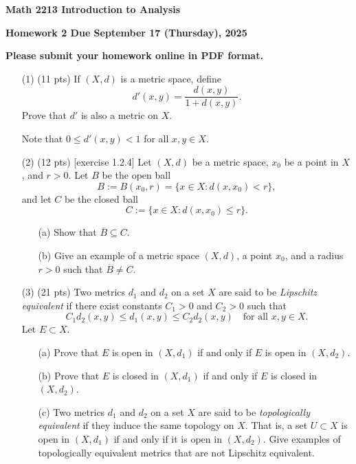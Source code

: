 \documentclass[12pt]{amsart}
\theoremstyle{definition}
\theoremstyle{remark}
\begin{document}
\begin{CJK}{UTF8}{bkai}

{\centerline{\bf Math 2213 Introduction to Analysis  }}

{\centerline{\bf Homework 2  Due   September 17 (Thursday), 2025}}

{\centerline{\bf Please submit your homework online in PDF format.}}


 
\begin{enumerate}

\item[(1)]  (11 pts) 
If $(X,d)$ is a metric space, define
\[
d'(x,y) = \frac{d(x,y)}{1 + d(x,y)}.
\]
Prove that $d'$ is also a metric on $X$. 

\noindent
Note that $0 \leq d'(x,y) < 1$ for all $x,y \in X$.

\vfill
\bigskip


\item[(2)]  (12 pts) [exercise 1.2.4]
Let $(X,d)$ be a metric space, $x_0$ be a point in $X$, and $r>0$. Let $B$ be the open ball
\[
B := B(x_0,r) = \{ x \in X : d(x,x_0) < r \},
\]
and let $C$ be the closed ball
\[
C := \{ x \in X : d(x,x_0) \leq r \}.
\]

\begin{enumerate}
  \item[(a)] Show that $\overline{B} \subseteq C$.
  \item[(b)] Give an example of a metric space $(X,d)$, a point $x_0$, and a radius $r>0$ such that $\overline{B} \neq C$.
\end{enumerate}


	
\vfill
\bigskip

\item[(3)]  (21 pts) Two metrics $d_1$ and $d_2$ on a set $X$ are said to be \emph{Lipschitz equivalent} if there exist constants $C_1>0$ and $C_2>0$ such that
\[
C_1 d_2(x,y) \leq d_1(x,y) \leq C_2 d_2(x,y) \quad \text{for all } x,y \in X.
\]
Let $E \subset X$.
\begin{enumerate}
  \item[(a)] Prove that $E$ is open in $(X,d_1)$ if and only if $E$ is open in $(X,d_2)$.
  \item[(b)] Prove that $E$ is closed in $(X,d_1)$ if and only if $E$ is closed in $(X,d_2)$.
  \item[(c)] Two metrics $d_1$ and $d_2$ on a set $X$ are said to be \emph{topologically equivalent} if they induce the same topology on $X$. That is, a set $U \subset X$ is open in $(X,d_1)$ if and only if it is open in $(X,d_2)$. Give examples of topologically equivalent metrics that are not Lipschitz equivalent.
\end{enumerate}


\end{enumerate}
\end{CJK}
\end{document}
